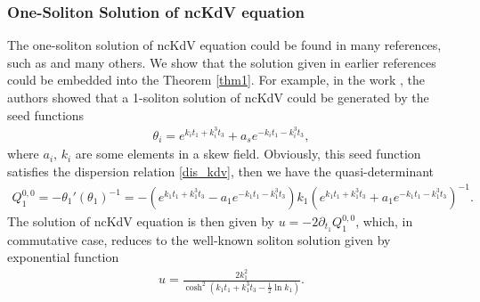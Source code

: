 \documentclass[11p,reqno]{amsart}
\numberwithin{equation}{section}
\numberwithin{equation}{section}
\begin{document}
\subsubsection{One-Soliton Solution of ncKdV equation} 
The one-soliton solution of ncKdV equation could be found in many references, such as \cite{paniak01,etingof97} and many others. We show that the solution given in earlier references could be embedded into the Theorem \ref{thm1}. For example, in the work \cite[Appendix A]{etingof97}, the authors showed that a 1-soliton solution of ncKdV could be generated by the seed functions
\begin{align*}
\theta_i=e^{k_i t_1+k_i^3t_3}+a_se^{-k_it_1-k_i^3t_3},
\end{align*}
where $a_i,\,k_i$ are some elements in a skew field. 
Obviously, this seed function satisfies the dispersion relation \eqref{dis_kdv}, then we have the quasi-determinant
\begin{align*}
Q_1^{0,0}=-\theta_1'(\theta_1)^{-1}=-(e^{k_1t_1+k_1^3t_3}-a_1e^{-k_1t_1-k_1^3t_3})k_1(e^{k_1t_1+k_1^3t_3}+a_1e^{-k_1t_1-k_1^3t_3})^{-1}.
\end{align*}
The solution of ncKdV equation is then given by $u=-2\partial_{t_1} Q_1^{0,0}$, which, in commutative case, reduces to the well-known soliton solution given by exponential function 
\begin{align*}
u=\frac{2k_1^2}{\cosh^2(k_1t_1+k_1^3t_3-\frac{1}{2}\ln k_1)}.
\end{align*}
\end{document}
